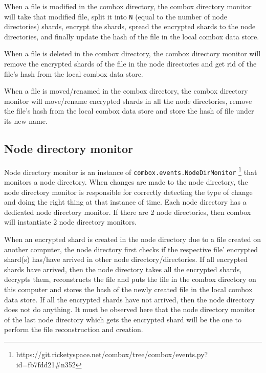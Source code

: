 When a file is modified in the combox directory, the combox directory
monitor will take that modified file, split it into \verb+N+ (equal to
the number of node directories) shards, encrypt the shards, spread the
encrypted shards to the node directories, and finally update the hash
of the file in the local combox data store.

When a file is deleted in the combox directory, the combox directory
monitor will remove the encrypted shards of the file in the node
directories and get rid of the file's hash from the local combox data
store.

When a file is moved/renamed in the combox directory, the combox
directory monitor will move/rename encrypted shards in all the node
directories, remove the file's hash from the local combox data store
and store the hash of file under its new name.

\subsection{Node directory monitor}\label{sec:3-combox-nodirm}

Node directory monitor is an instance of
\verb+combox.events.NodeDirMonitor+
\footnote{https://git.ricketyspace.net/combox/tree/combox/events.py?id=fb7fdd21\#n352}
that monitors a node directory. When changes are made to the node
directory, the node directory monitor is responsible for correctly
detecting the type of change and doing the right thing at that
instance of time. Each node directory has a dedicated node directory
monitor. If there are 2 node directories, then combox will instantiate
2 node directory monitors.

When an encrypted shard is created in the node directory due to a file
created on another computer, the node directory first checks if the
respective file' encrypted shard(s) has/have arrived in other node
directory/directories. If all encrypted shards have arrived, then the
node directory takes all the encrypted shards, decrypts them,
reconstructs the file and puts the file in the combox directory on
this computer and stores the hash of the newly created file in the
local combox data store. If all the encrypted shards have not arrived,
then the node directory does not do anything. It must be observed here
that the node directory monitor of the last node directory which gets
the encrypted shard will be the one to perform the file reconstruction
and creation.

